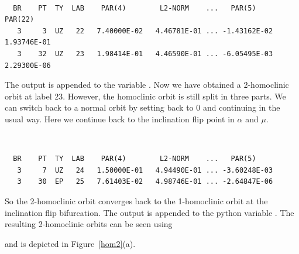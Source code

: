\documentclass[12pt]{report}
\begin{document}
\begin{center}
 \\
\end{center} 
\begin{verbatim}
  BR    PT  TY  LAB    PAR(4)        L2-NORM    ...   PAR(5)        PAR(22)    
   3     3  UZ   22   7.40000E-02   4.46781E-01 ... -1.43162E-02   1.93746E-01
   3    32  UZ   23   1.98414E-01   4.46590E-01 ... -6.05495E-03   2.29300E-06
\end{verbatim}
The output is appended to the \python variable .
Now we have obtained a 2-homoclinic orbit at label 23. However, the
homoclinic orbit is still split in three parts. We can switch back to
a normal orbit by setting  back to 0 and continuing in the usual
way. Here we continue back to the inclination flip point in $\alpha$
and $\mu$.
\begin{center}
 \\
\end{center} 
\begin{verbatim}
  BR    PT  TY  LAB    PAR(4)        L2-NORM    ...   PAR(5)     
   3     7  UZ   24   1.50000E-01   4.94490E-01 ... -3.60248E-03
   3    30  EP   25   7.61403E-02   4.98746E-01 ... -2.64847E-06
\end{verbatim}
So the 2-homoclinic orbit converges back to the 1-homoclinic orbit at
the inclination flip bifurcation.
The output is appended to the python variable .
The resulting 2-homoclinic orbits can be seen using
\begin{center}
\end{center} 
and is depicted in Figure~\ref{hom2}(a).
\end{document}
